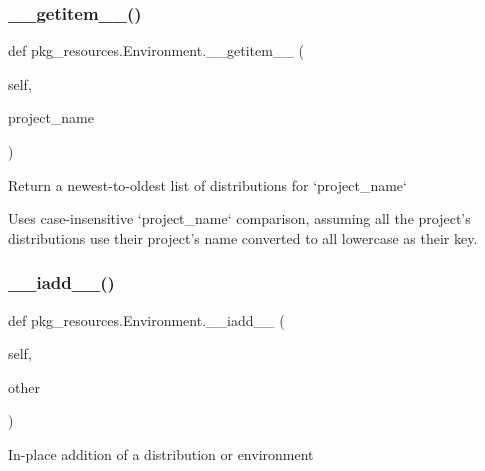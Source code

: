 \subsubsection{\texorpdfstring{\+\_\+\+\_\+getitem\+\_\+\+\_\+()}{\_\_getitem\_\_()}}
{\footnotesize\ttfamily def pkg\+\_\+resources.\+Environment.\+\_\+\+\_\+getitem\+\_\+\+\_\+ (\begin{DoxyParamCaption}\item[{}]{self,  }\item[{}]{project\+\_\+name }\end{DoxyParamCaption})}

\begin{DoxyVerb}Return a newest-to-oldest list of distributions for `project_name`

Uses case-insensitive `project_name` comparison, assuming all the
project's distributions use their project's name converted to all
lowercase as their key.\end{DoxyVerb}
 \mbox{\label{classpkg__resources_1_1Environment_ac8fc54442fe5e9c647b57320e7ccf78a}} 
\subsubsection{\texorpdfstring{\+\_\+\+\_\+iadd\+\_\+\+\_\+()}{\_\_iadd\_\_()}}
{\footnotesize\ttfamily def pkg\+\_\+resources.\+Environment.\+\_\+\+\_\+iadd\+\_\+\+\_\+ (\begin{DoxyParamCaption}\item[{}]{self,  }\item[{}]{other }\end{DoxyParamCaption})}

\begin{DoxyVerb}In-place addition of a distribution or environment\end{DoxyVerb}
 \mbox{\label{classpkg__resources_1_1Environment_a7f967904be209cefe39230614470ca3f}} 
